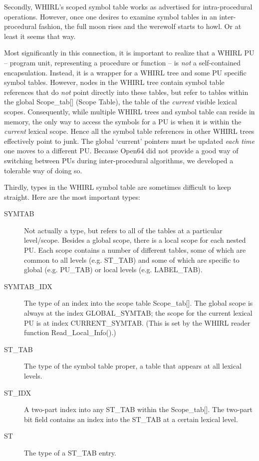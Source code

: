 Secondly, WHIRL's scoped symbol table works as advertised for
intra-procedural operations.  However, once one desires to examine
symbol tables in an inter-procedural fashion, the full moon rises
and the werewolf starts to howl.  Or at least it seems that way.

Most significantly in this connection, it is important to realize
that a WHIRL PU -- program unit, representing a procedure or
function -- is \textit{not} a self-contained encapsulation.
Instead, it is a wrapper for a WHIRL tree and some PU specific
symbol tables.  However, nodes in the WHIRL tree contain symbol
table references that do \textit{not} point directly into these
tables, but refer to tables within the global Scope\_tab[] (Scope
Table), the table of the \textit{current} visible lexical scopes.
Consequently, while multiple WHIRL trees and symbol table can reside
in memory, the only way to access the symbols for a PU is when it is
within the \textit{current} lexical scope.  Hence all the symbol table
references in other WHIRL trees effectively point to junk.  The
global `current' pointers must be updated \textit{each time} one
moves to a different PU.  Because Open64 did not provide a good way
of switching between PUs during inter-procedural algorithms, we
developed a tolerable way of doing so.

Thirdly, types in the WHIRL symbol table are sometimes difficult to
keep straight.  Here are the most important types:

\begin{description}

  \item [SYMTAB] Not actually a type, but refers to all of the tables
  at a particular level/scope.  Besides a global scope, there is a
  local scope for each nested PU.  Each scope contains a number of
  different tables, some of which are common to all levels
  (e.g. ST\_TAB) and some of which are specific to global (e.g. PU\_TAB)
  or local levels (e.g. LABEL\_TAB).

  \item [SYMTAB\_IDX] The type of an index into the scope table
  Scope\_tab[].  The global scope is always at the index
  GLOBAL\_SYMTAB; the scope for the current lexical PU is at index
  CURRENT\_SYMTAB.  (This is set by the WHIRL reader function
  Read\_Local\_Info().)

  \item [ST\_TAB] The type of the symbol table proper, a table that
  appears at all lexical levels.

  \item [ST\_IDX] A two-part index into any ST\_TAB within the
  Scope\_tab[].  The two-part bit field contains an index into the
  ST\_TAB at a certain lexical level.

  \item [ST] The type of a ST\_TAB entry.

\end{description}



